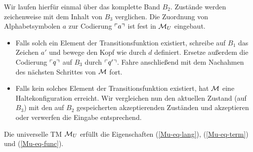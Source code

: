  Wir laufen hierfür einmal über das komplette Band $B_2$. 
 Zustände werden zeichenweise mit dem Inhalt von $B_3$ verglichen.
 Die Zuordnung von Alphabetsymbolen $a$ zur Codierung $\ulcorner a \urcorner$ ist fest in $\mathcal{M}_U$ eingebaut.
 
 \begin{itemize}
 
 \item Falls solch ein Element der Transitionsfunktion existiert,
    schreibe auf $B_1$ das Zeichen $a'$ und bewege den Kopf wie durch $d$ definiert.
    Ersetze außerdem die Codierung $\ulcorner q \urcorner$ auf $B_3$ durch $\ulcorner q' \urcorner$.
    Fahre anschließend mit dem Nachahmen des nächsten Schrittes von $\mathcal{M}$ fort.
    
 \item Falls kein solches Element der Transitionsfunktion existiert, hat $\mathcal{M}$ eine Haltekonfiguration erreicht.
 Wir vergleichen nun den aktuellen Zustand (auf $B_3$) mit den auf $B_2$ gespeicherten akzeptierenden Zuständen und akzeptieren oder verwerfen die Eingabe entsprechend.

\end{itemize}

\begin{Satz}
	Die universelle \ac{TM} $\mathcal{M}_U$ erfüllt die Eigenschaften (\ref{Mu-eq-lang}), (\ref{Mu-eq-term}) und (\ref{Mu-eq-func}).
\end{Satz}


